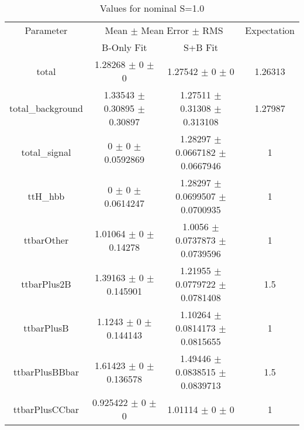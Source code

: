\begin{table}
\centering
\caption{Values for nominal S=1.0}
\begin{tabular}{cccc}
\toprule
Parameter & \multicolumn{2}{c}{Mean $\pm$ Mean Error $\pm$ RMS} & Expectation\\
 & B-Only Fit & S+B Fit & \\
\midrule
total & \num{1.28268} $\pm$ \num{0} $\pm$ \num{0} & \num{1.27542} $\pm$ \num{0} $\pm$ \num{0} & \num{1.26313}\\
total\_background & \num{1.33543} $\pm$ \num{0.30895} $\pm$ \num{0.30897} & \num{1.27511} $\pm$ \num{0.31308} $\pm$ \num{0.313108} & \num{1.27987}\\
total\_signal & \num{0} $\pm$ \num{0} $\pm$ \num{0.0592869} & \num{1.28297} $\pm$ \num{0.0667182} $\pm$ \num{0.0667946} & \num{1}\\
ttH\_hbb & \num{0} $\pm$ \num{0} $\pm$ \num{0.0614247} & \num{1.28297} $\pm$ \num{0.0699507} $\pm$ \num{0.0700935} & \num{1}\\
ttbarOther & \num{1.01064} $\pm$ \num{0} $\pm$ \num{0.14278} & \num{1.0056} $\pm$ \num{0.0737873} $\pm$ \num{0.0739596} & \num{1}\\
ttbarPlus2B & \num{1.39163} $\pm$ \num{0} $\pm$ \num{0.145901} & \num{1.21955} $\pm$ \num{0.0779722} $\pm$ \num{0.0781408} & \num{1.5}\\
ttbarPlusB & \num{1.1243} $\pm$ \num{0} $\pm$ \num{0.144143} & \num{1.10264} $\pm$ \num{0.0814173} $\pm$ \num{0.0815655} & \num{1}\\
ttbarPlusBBbar & \num{1.61423} $\pm$ \num{0} $\pm$ \num{0.136578} & \num{1.49446} $\pm$ \num{0.0838515} $\pm$ \num{0.0839713} & \num{1.5}\\
ttbarPlusCCbar & \num{0.925422} $\pm$ \num{0} $\pm$ \num{0} & \num{1.01114} $\pm$ \num{0} $\pm$ \num{0} & \num{1}\\
\bottomrule
\end{tabular}
\end{table}